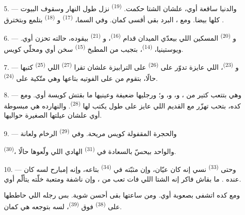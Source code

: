 5. --- والدنيا ساقعة أوي، علشان الشتا حكمت.  \textsuperscript{(19)} نزل
طول النهار وسقوف البيوت كلها بيضا. ومع ، البرد بقى أقسى كمان. وفي
السما،  \textsuperscript{(17)} و \textsuperscript{(18)} بتلمع
وبتخترق
.

\VUsaut{4.2mm}
\VUsaut{3.0mm}

6. --- و \textsuperscript{(20)} المسكين اللي بيعدّي الميدان قدام
 \textsuperscript{(16)}، و \textsuperscript{(21)}
بيقوده،
حالته تحزن أوي. ويوستينيا،  \textsuperscript{(14)}، بتجيب من المطبخ
 \textsuperscript{(15)}  سخن أوي ومحلّي كويس.

7. --- و \textsuperscript{(23)}، اللي عايزة تدوّر على 
\textsuperscript{(26)} على الترابيزة علشان تقرا  \textsuperscript{(27)} اللي
 \textsuperscript{(25)} كتبها حالًا، بتقوم من على الفوتيه بتاعها وهي
متّكية على  \textsuperscript{(24)}.

8. --- وهي بتتعب كتير من ، و،
و، و؛ ورجليها ضعيفة وعينيها ما بقتش كويسة أوي.
ومع كده، بتحب تهزّر مع  القديم اللي عايز على طول يكتب لها
 \textsuperscript{(28)}. والنهارده هي مبسوطة أوي علشان عيلتها الصغيرة
حواليها.

9. --- والحجرة المقفولة كويس مريحة. وفي  \textsuperscript{(29)} الرخام
ولعانة

 \textsuperscript{(30)}، والواحد بيحسّ بالسعادة في 
 \textsuperscript{(31)} الهادي اللي ولّعوها حالًا.

\VUsaut{4.2mm}
\VUsaut{3.0mm}

10. --- وحتى  \textsuperscript{(33)} نسي إنه كان عيّان، وإن
 مثبّته في  \textsuperscript{(34)} بتاعه، وإنه إمبارح
لسه كان عنده . ما بقاش فاكر إنه الشتا اللي فات تعب من
، وإن  ناشفة ومتعبة خلّته يتألّم أوي.

ومع كده اتشفى بصعوبة أوي. ومن ساعتها بقى أحسن شوية. بس رجله اللي حاططها على
 \textsuperscript{(38)} فوق  \textsuperscript{(39)}، لسه
بتوجعه هي كمان.

